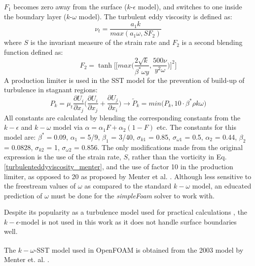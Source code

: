 $F_1$ becomes zero away from the surface ($k$-$\epsilon$ model), and switches to one inside the boundary layer ($k$-$\omega$ model).
The turbulent eddy viscosity is defined as:
\begin{equation}\label{turbulenteddyviscosity_menter}
	\nu_t = \frac{a_1 k}{max(a_1\omega,S F_2)}
\end{equation}
where $S$ is the invariant measure of the strain rate and $F_2$ is a second blending function defined as:
\begin{equation}
	F_2 = \tanh\bigg[\Big[max\big(\frac{2\sqrt{k}}{\beta^\ast\omega y},\frac{500\nu}{y^2\omega}\big)\Big]^2\bigg]
\end{equation}
A production limiter is used in the SST model for the prevention of build-up of turbulence in stagnant regions:
\begin{equation}
	P_k = \mu_t\frac{\partial U_i}{\partial x_j}\bigg(\frac{\partial U_i}{\partial x_j} + \frac{\partial U_j}{\partial x_i}\bigg) \rightarrow \tilde{P}_k = min \big(P_k,10\cdot\beta^\ast\rho k\omega\big)
\end{equation}
All constants are calculated by blending the corresponding constants from the $k-\epsilon$ and $k-\omega$ model via $\alpha = \alpha_1F + \alpha_2(1-F)$ etc. The constants for this model are: $\beta^\ast = 0.09$, $\alpha_1$ = 5/9, $\beta_1$ = 3/40, $\sigma_{k1}$ = 0.85, $\sigma_{\omega1}$ = 0.5, $\alpha_2$ = 0.44, $\beta_2$ = 0.0828, $\sigma_{k2}$ = 1, $\sigma_{\omega2}$ = 0.856.
The only modifications made from the original expression is the use of the strain rate, $S$, rather than the vorticity in Eq. \ref{turbulenteddyviscosity_menter}, and the use of factor 10 in the production limiter, as opposed to 20 as proposed by Menter et al. \cite{Menter1993,Menter1994}. Although less sensitive to the freestream values of $\omega$ as compared to the standard $k-\omega$ model, an educated prediction of $\omega$ must be done for the \emph{simpleFoam} solver to work with.

Despite its popularity as a turbulence model used for practical calculations \cite{Rodi1991}, the $k-\epsilon$-model is not used in this work as it does not handle surface boundaries well.

The $k-\omega$-SST model used in OpenFOAM\textsuperscript{\textregistered} is obtained from the 2003 model by Menter et. al. \cite{Menter2003}.

